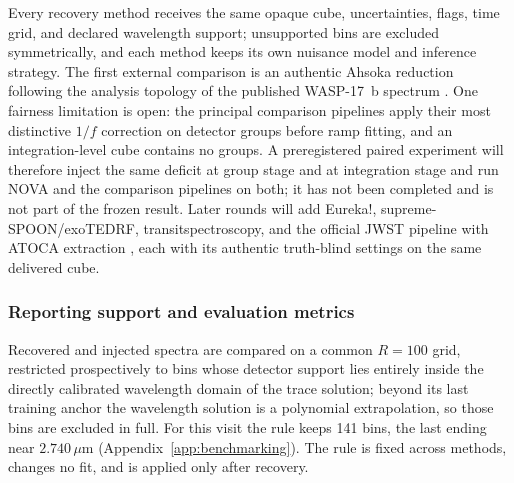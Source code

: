 Every recovery method receives the same opaque cube, uncertainties, flags,
time grid, and declared wavelength support; unsupported bins are excluded
symmetrically, and each method keeps its own nuisance model and inference
strategy. The first external comparison is an authentic Ahsoka reduction
following the analysis topology of the published WASP-17~b spectrum
\citep{LouieEtAl2025}. One fairness limitation is open: the principal
comparison pipelines apply their most distinctive $1/f$ correction on
detector groups before ramp fitting, and an integration-level cube
contains no groups. A preregistered paired experiment will therefore inject
the same deficit at group stage and at integration stage and run NOVA and
the comparison pipelines on both; it has not been completed and is not
part of the frozen result. Later rounds will add Eureka!,
supreme-SPOON/exoTEDRF, transitspectroscopy, and the official JWST
pipeline with ATOCA extraction
\citep{BellEtAl2022,Radica2024,Espinoza2022TransitSpectroscopy,%
JWSTPipeline2025,DarveauBernierEtAl2022,LouieEtAl2025}, each with its
authentic truth-blind settings on the same delivered cube.

\subsubsection{Reporting support and evaluation metrics}


Recovered and injected spectra are compared on a common $R=100$ grid,
restricted prospectively to bins whose detector support lies entirely
inside the directly calibrated wavelength domain of the trace solution;
beyond its last training anchor the wavelength solution is a polynomial
extrapolation, so those bins are excluded in full. For this visit the
rule keeps 141 bins, the last ending near $2.740\,\mu\mathrm{m}$
(Appendix~\ref{app:benchmarking}). The rule is fixed across methods,
changes no fit, and is applied only after recovery.

